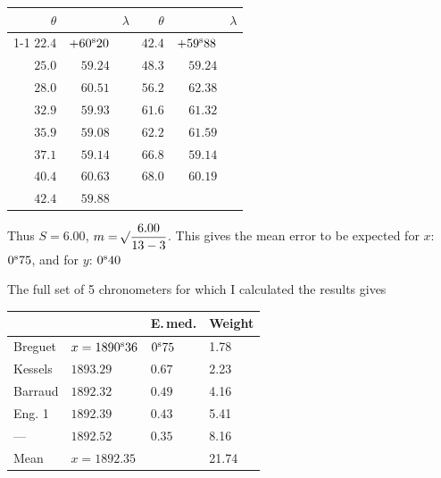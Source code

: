 \begin{center}
\begingroup\small\renewcommand{\arraystretch}{1.25}
\begin{tabular}{r|r r@{\qquad}r|r r}
$\theta$ & & $\lambda$ & $\theta$ & & $\lambda$ \\
\cline{1-1}\cline{3-4}\cline{6-6}
$22.4$ & $+60^{\rm s}20$ & \raisebox{-7pt}{$-0^{\rm s}96$} & $42.4$ & $+59^{\rm s}88$ & \raisebox{-7pt}{$-0^{\rm s}62$} \\
$25.0$ & $59.24$ & \raisebox{-7pt}{$+1.27$} & $48.3$ & $59.24$ & \raisebox{-7pt}{$+3.14$} \\
$28.0$ & $60.51$ & \raisebox{-7pt}{$-0.58$} & $56.2$ & $62.38$ & \raisebox{-7pt}{$-1.06$} \\
$32.9$ & $59.93$ & \raisebox{-7pt}{$-0.85$} & $61.6$ & $61.32$ & \raisebox{-7pt}{$+0.27$} \\
$35.9$ & $59.08$ & \raisebox{-7pt}{$+0.06$} & $62.2$ & $61.59$ & \raisebox{-7pt}{$-2.45$} \\
$37.1$ & $59.14$ & \raisebox{-7pt}{$+1.47$} & $66.8$ & $59.14$ & \raisebox{-7pt}{$+1.05$} \\
$40.4$ & $60.63$ & \raisebox{-7pt}{$-0.75$} & $68.0$ & $60.19$ &  \\
$42.4$ & $59.88$ &  &  &  &  \\
\end{tabular}
\endgroup
\end{center}

Thus $S=6.00$, $m=\mathord{{}^{}\!\surd}\dfrac{6.00}{13-3}$. This gives the mean error to be expected for $x$: $0^{\rm s}75$, and for $y$: $0^{\rm s}40$

The full set of 5 chronometers for which I calculated the results gives

\begin{center}
\begin{tabular}{ll|l|l}
 & & E.\,med. & Weight \\
\hline
Breguet & $x=1890^{\rm s}36$ & $0^{\rm s}75$ & 1.78 \\
Kessels & $1893.29$ & $0.67$ & 2.23 \\
Barraud & $1892.32$ & $0.49$ & 4.16 \\
Eng. 1 & $1892.39$ & $0.43$ & 5.41 \\
---\quad 4 & $1892.52$ & $0.35$ & 8.16 \\
\hline
Mean & $x=1892.35$ & & 21.74 \\
\end{tabular}
\end{center}

